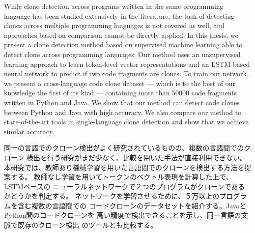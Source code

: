 \begin{eabstract}
While clone detection across programs written in the same programming language
has been studied extensively in the literature, the task of detecting clones
across multiple programming languages is not covered as well, and approaches
based on comparison cannot be directly applied.
In this thesis, we present a clone detection method based on supervised
machine learning able to detect clone across programming languages.
Our method uses an unsupervised learning approach to learn token-level vector
representations and an LSTM-based neural network to predict if two code
fragments are clones. To train our network, we present a cross-language code
clone dataset --- which is to the best of our knowledge the first of its kind
--- containing more than 50000 code fragments written in Python and Java.
We show that our method can detect code clones between Python and Java with high
accuracy. We also compare our method to state-of-the-art tools in
single-language clone detection and show that we achieve similar accuracy.
\end{eabstract}

\begin{jabstract}
同一の言語でのクローン検出がよく研究されているものの、複数の言語間でのクローン%
検出を行う研究がまだ少なく、比較を用いた手法が直接利用できない。%
本研究では、教師あり機械学習を用いた言語間でのクローンを検出する方法を提案する。%
教師なし学習を用いてトークンのベクトル表現を計算した上で、LSTMベースの%
ニューラルネットワークで２つのプログラムがクローンであるかどうかを判定する。%
ネットワークを学習させるために、５万以上のプログラムを含む複数の言語間での%
コードクローンのデータセットを紹介する。JavaとPython間のコードクローンを%
高い精度で検出できることを示し、同一言語の文脈で既存のクローン検出%
のツールとも比較する。
\end{jabstract}
